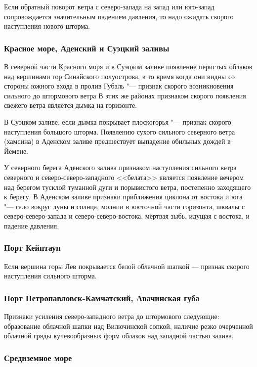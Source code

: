 Если обратный поворот ветра с северо-запада на запад или юго-запад
сопровождается значительным падением давления, то надо ожидать скорого
наступления нового шторма.

\subsubsection{Красное море, Аденский и Суэцкий заливы}

В северной части Красного моря и в Суэцком заливе появление перистых
облаков над вершинами гор Синайского полуострова, в то время когда они
видны со стороны южного входа в пролив Губаль "--- признак скорого
возникновения сильного до штормового ветра В этих же районах признаком
скорого появления свежего ветра является дымка на горизонте.

В Суэцком заливе, если дымка покрывает плоскогорья "--- признак скорого
наступления большого шторма. Появлению сухого сильного северного ветра
(хамсина) в Аденском заливе предшествует выпадение обильных дождей в
Йемене.

У северного берега Аденского залива признаком наступления сильного
ветра северного и северо-северо-западного <<белата>> является появление
вечером над берегом тусклой туманной дуги и порывистого ветра,
постепенно заходящего к берегу. В Аденском заливе признаки приближения
циклона от востока и юга "--- гало вокруг луны и солнца, молнии в
восточной части горизонта, шквалы с северо-северо-запада и
северо-северо-востока, мёртвая зыбь, идущая с востока, и падение
давления.

\subsubsection{Порт Кейптаун}

Если вершина горы Лев покрывается белой облачной шапкой — признак
скорого наступления сильного шторма.

\subsubsection{Порт Петропавловск-Камчатский, Авачинская губа}

Признаки усиления северо-западного ветра до штормового следующие:
образование облачной шапки над Вилючинской сопкой, наличие резко
очерченной облачной гряды кучевообразных форм облаков над западной
частью залива.

\subsubsection{Средиземное море}

